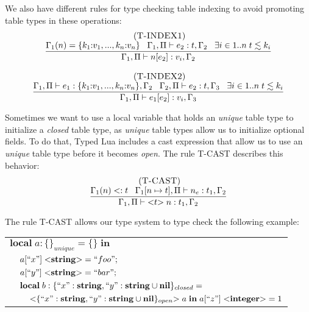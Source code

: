 We also have different rules for type checking table indexing to avoid
promoting table types in these operations:
\[
\begin{array}{c}
\begin{array}{c}
\; (\textsc{T-INDEX1})\\
\dfrac{\Gamma_{1}(n) = \{k_{1}{:}v_{1}, ..., k_{n}{:}v_{n}\} \;\;\;
       \Gamma_{1}, \Pi \vdash e_{2}:t, \Gamma_{2} \;\;\;
       \exists i \in 1{..}n \; t \lesssim k_{i}}
      {\Gamma_{1}, \Pi \vdash n[e_{2}]:v_{i}, \Gamma_{2}}
\end{array}
\\ \\
\begin{array}{c}
\; (\textsc{T-INDEX2})\\
\dfrac{\Gamma_{1}, \Pi \vdash e_{1}:\{k_{1}{:}v_{1}, ..., k_{n}{:}v_{n}\}, \Gamma_{2} \;\;\;
       \Gamma_{2}, \Pi \vdash e_{2}:t, \Gamma_{3} \;\;\;
       \exists i \in 1{..}n \; t \lesssim k_{i}}
      {\Gamma_{1}, \Pi \vdash e_{1}[e_{2}]:v_{i}, \Gamma_{3}}
\end{array}
\end{array}
\]

Sometimes we want to use a local variable that holds an \emph{unique}
table type to initialize a \emph{closed} table type, as \emph{unique}
table types allow us to initialize optional fields.
To do that, Typed Lua includes a cast expression that allow us
to use an \emph{unique} table type before it becomes \emph{open}.
The rule \textsc{T-CAST} describes this behavior:
\[
\begin{array}{c}
\; (\textsc{T-CAST})\\
\dfrac{\Gamma_{1}(n) <: t \;\;\;
       \Gamma_{1}[n \mapsto t], \Pi \vdash n_{e}:t_{1}, \Gamma_{2}}
      {\Gamma_{1}, \Pi \vdash {<}t{>} \; n:t_{1}, \Gamma_{2}}
\end{array}
\]

The rule \textsc{T-CAST} allows our type system to type check the following example:
\begin{center}
\begin{tabular}{lll}
\multicolumn{3}{l}{$\mathbf{local} \; a:\{\}_{unique} = \{ \} \; \mathbf{in}$}\\
& \multicolumn{2}{l}{$a[``x"] \; {<}\mathbf{string}{>} = ``foo";$}\\
& \multicolumn{2}{l}{$a[``y"] \; {<}\mathbf{string}{>} = ``bar";$}\\
& \multicolumn{2}{l}{$\mathbf{local} \; b:\{``x":\mathbf{string}, ``y":\mathbf{string} \cup \mathbf{nil} \}_{closed} =$}\\
& & \multicolumn{1}{l}{${<}\{``x":\mathbf{string}, ``y":\mathbf{string} \cup \mathbf{nil}\}_{open}{>} \; a \; \mathbf{in} \; a[``z"] \; {<}\mathbf{integer}{>} = 1$}
\end{tabular}
\end{center}

